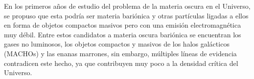 
En los primeros a\~nos de estudio del problema de la materia oscura en el Universo, se propuso que esta podría ser materia bariónica y otras partículas ligadas a ellos en forma de objetos compactos masivos pero con una emisión electromagnética muy débil. Entre estos candidatos a materia oscura bariónica se encuentran los gases no luminosos, los objetos compactos y masivos de los halos galácticos (MACHOs) y las enanas marrones, sin embargo, múltiples líneas de evidencia contradicen este hecho, ya que contribuyen muy poco a la densidad crítica del Universo.

